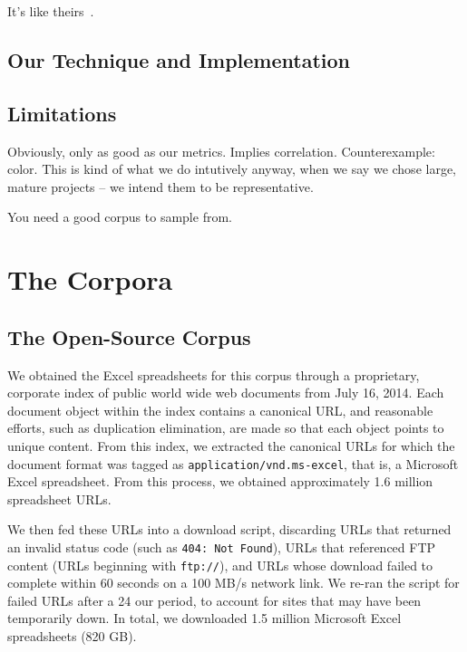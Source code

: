 \documentclass[conference]{IEEEtran}
\begin{document}
It's like theirs~\cite{nagappan2013diversity}.

\subsection{Our Technique and Implementation}

\subsection{Limitations}

Obviously, only as good as our metrics. Implies correlation. Counterexample: color.
This is kind of what we do intutively anyway, when we say we chose large, mature projects -- we intend them
to be representative.

You need a good corpus to sample from.

\section{The Corpora}

\subsection{The Open-Source Corpus}


We obtained the Excel spreadsheets for this corpus through a proprietary, corporate index of public world wide web documents from July 16, 2014. 
%
Each document object within the index contains a canonical URL, and reasonable efforts, such as duplication elimination, are made so that each object points to unique content. 
%
From this index, we extracted the canonical URLs for which the document format was tagged as \texttt{application/vnd.ms-excel}, that is, a Microsoft Excel spreadsheet. 
%
From this process, we obtained approximately 1.6 million spreadsheet URLs.

We then fed these URLs into a download script, discarding URLs that returned an invalid status code (such as \texttt{404: Not Found}), URLs that referenced FTP content (URLs beginning with \texttt{ftp://}), and URLs whose download failed to complete within 60 seconds on a 100 MB/s network link. 
%
We re-ran the script for failed URLs after a 24 our period, to account for sites that may have been temporarily down. 
%
In total, we downloaded 1.5 million Microsoft Excel spreadsheets (820 GB). 
\end{document}
